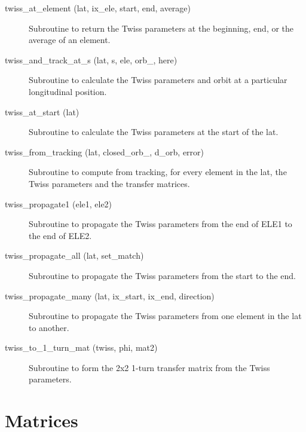 \begin{description}
\item[twiss_at_element (lat, ix_ele, start, end, average)] \Newline
Subroutine to return the Twiss parameters at the beginning, end, or the average of an element. 

\item[twiss_and_track_at_s (lat, s, ele, orb_, here)] \Newline
Subroutine to calculate the Twiss parameters and orbit at a particular longitudinal position. 

\item[twiss_at_start (lat)] \Newline
Subroutine to calculate the Twiss parameters at the start of the lat. 

\item[twiss_from_tracking (lat, closed_orb_, d_orb, error)] \Newline
Subroutine to compute from tracking, for every element in the lat, 
the Twiss parameters and the transfer matrices. 

\item[twiss_propagate1 (ele1, ele2)] \Newline
Subroutine to propagate the Twiss parameters from the end of ELE1 to the end of ELE2. 

\item[twiss_propagate_all (lat, set_match)] \Newline
Subroutine to propagate the Twiss parameters from the start to the end. 

\item[twiss_propagate_many (lat, ix_start, ix_end, direction)] \Newline
Subroutine to propagate the Twiss parameters from one element in the lat to another. 

\item[twiss_to_1_turn_mat (twiss, phi, mat2)] \Newline
Subroutine to form the 2x2 1-turn transfer matrix from the Twiss parameters. 

\end{description}

\section{Matrices}
\label{r:mat}

